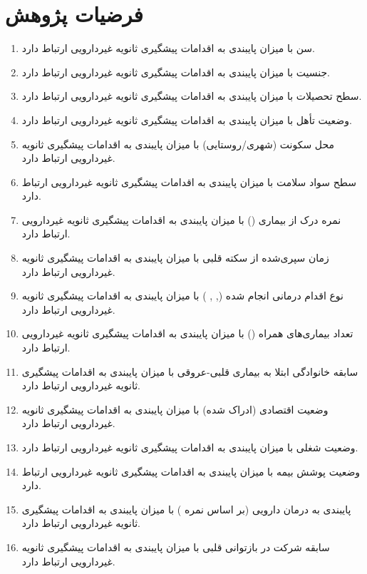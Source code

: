 \section{فرضیات پژوهش}
\label{sec:hypotheses}
\begin{enumerate}[label=\arabic*.]

\item سن با میزان پایبندی به اقدامات پیشگیری ثانویه غیردارویی ارتباط دارد.

\item جنسیت با میزان پایبندی به اقدامات پیشگیری ثانویه غیردارویی ارتباط دارد.

\item سطح تحصیلات با میزان پایبندی به اقدامات پیشگیری ثانویه غیردارویی ارتباط دارد.

\item وضعیت تأهل با میزان پایبندی به اقدامات پیشگیری ثانویه غیردارویی ارتباط دارد.

\item محل سکونت (شهری/روستایی) با میزان پایبندی به اقدامات پیشگیری ثانویه غیردارویی ارتباط دارد.

\item سطح سواد سلامت با میزان پایبندی به اقدامات پیشگیری ثانویه غیردارویی ارتباط دارد.

\item نمره درک از بیماری () با میزان پایبندی به اقدامات پیشگیری ثانویه غیردارویی ارتباط دارد.

\item زمان سپری‌شده از سکته قلبی با میزان پایبندی به اقدامات پیشگیری ثانویه غیردارویی ارتباط دارد.

\item نوع اقدام درمانی انجام شده (, , ) با میزان پایبندی به اقدامات پیشگیری ثانویه غیردارویی ارتباط دارد.

\item تعداد بیماری‌های همراه () با میزان پایبندی به اقدامات پیشگیری ثانویه غیردارویی ارتباط دارد.

\item سابقه خانوادگی ابتلا به بیماری قلبی-عروقی با میزان پایبندی به اقدامات پیشگیری ثانویه غیردارویی ارتباط دارد.

\item وضعیت اقتصادی (ادراک شده) با میزان پایبندی به اقدامات پیشگیری ثانویه غیردارویی ارتباط دارد.

\item وضعیت شغلی با میزان پایبندی به اقدامات پیشگیری ثانویه غیردارویی ارتباط دارد.

\item وضعیت پوشش بیمه با میزان پایبندی به اقدامات پیشگیری ثانویه غیردارویی ارتباط دارد.

\item پایبندی به درمان دارویی (بر اساس نمره ) با میزان پایبندی به اقدامات پیشگیری ثانویه غیردارویی ارتباط دارد.

\item سابقه شرکت در بازتوانی قلبی با میزان پایبندی به اقدامات پیشگیری ثانویه غیردارویی ارتباط دارد.

\end{enumerate}

